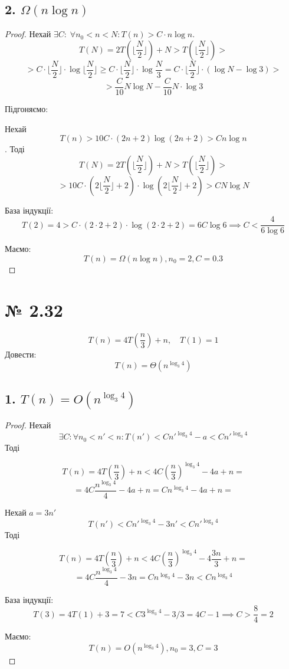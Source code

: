 \documentclass[11pt, a4paper]{article} %
\begin{document}
\subsection*{2. $\Omega(n\log n)$}
\begin{proof}
    Нехай $\exists C:\; \forall n_0 < n < N: T(n) > C\cdot n\log n$.
    $$T(N) = 2T(\lfloor \frac{N}{2} \rfloor) + N > T(\lfloor \frac{N}{2} \rfloor) > $$
    $$> C\cdot \lfloor \frac{N}{2} \rfloor \cdot \log \lfloor \frac{N}{2} \rfloor 
    \ge C \cdot \lfloor \frac{N}{2} \rfloor \cdot \log \frac{N}{3} = C \cdot \lfloor \frac{N}{2} \rfloor \cdot (\log N - \log 3) >$$
    $$> \frac{C}{10} N \log N - \frac{C}{10} N \cdot \log 3 $$

    Підгоняємо:

    Нехай $$T(n) > 10 C \cdot (2n+2)\log (2n+2) > C n \log n$$.
    Тоді
    $$T(N) = 2T(\lfloor \frac{N}{2} \rfloor) + N > T(\lfloor \frac{N}{2} \rfloor) > $$
    $$> 10 C \cdot (2\lfloor \frac{N}{2}\rfloor+2)\cdot  \log (2\lfloor \frac{N}{2} \rfloor+2) 
    > C N \log N$$

    База індукції:
    $$T(2) = 4 > C \cdot (2\cdot 2 + 2) \cdot \log (2\cdot 2 + 2) = 6C\log 6 \implies C < \frac{4}{6\log 6}$$
    
    Маємо: 
    $$T(n) = \Omega(n\log n), n_0 = 2, C = 0.3$$
\end{proof}

\section*{№ 2.32}
\begin{mdframed}
    $$T(n) = 4T(\frac{n}{3}) + n, \quad T(1)=1$$
    Довести:
    $$T(n) = \Theta(n^{\log_3 4})$$
\end{mdframed}

\subsection*{1. $T(n) = O(n^{\log_3 4})$}
\begin{proof}
    Нехай 
    $$\exists C: \forall n_0 < n' < n: T(n') < C n'^{\log_3 4} - a < C n'^{\log_3 4}$$
    Тоді

    $$T(n) = 4T(\frac{n}{3}) + n < 4C \left(\frac{n}{3}\right)^{\log_3 4} - 4a + n = $$
    $$= 4C \frac{n^{\log_3 4}}{4} -4a + n = C n^{\log_3 4} - 4a + n = $$
    
    Нехай $a = 3n'$
    $$T(n') < C n'^{\log_3 4} - 3n' < C n'^{\log_3 4}$$
    Тоді
    
    $$T(n) = 4T(\frac{n}{3}) + n < 4C \left(\frac{n}{3}\right)^{\log_3 4} - 4\frac{3n}{3} + n = $$
    $$= 4C \frac{n^{\log_3 4}}{4} - 3n = C n^{\log_3 4} - 3n < C n^{\log_3 4}$$
    
    База індукції:
    $$T(3) = 4T(1) + 3 = 7 < C 3^{\log_3 4} - 3/3 = 4C - 1 \implies C > \frac{8}{4} = 2$$

    Маємо:
    $$T(n) = O(n^{\log_3 4}), n_0=3, C = 3$$
\end{proof}
\end{document}
